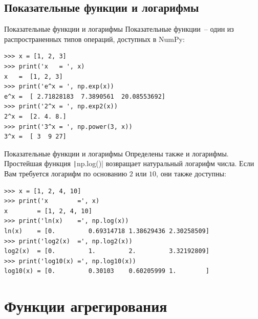 \documentclass[aspectratio=169, mathserif]{beamer}	%
\begin{document}
\subsection{Показательные функции и логарифмы}
\begin{frame}[fragile]{Показательные функции и логарифмы}
\scriptsize
Показательные функции~-- один из  распространенных типов операций, доступных в NumPy:

\begin{verbatim}
>>> x = [1, 2, 3]
>>> print('x   = ', x)
x   =  [1, 2, 3]   
>>> print('e^x = ', np.exp(x))
e^x =  [ 2.71828183  7.3890561  20.08553692]   
>>> print('2^x = ', np.exp2(x))
2^x =  [2. 4. 8.]   
>>> print('3^x = ', np.power(3, x))
3^x =  [ 3  9 27]
\end{verbatim}
\vfill
\end{frame}

\begin{frame}[fragile]{Показательные функции и логарифмы}
\scriptsize
Определены также и логарифмы. Простейшая функция \texttt|np.log()| возвращает натуральный логарифм числа. Если Вам требуется логарифм по основанию $2$ или $10$, они также доступны:

\begin{verbatim}
>>> x = [1, 2, 4, 10]
>>> print('x        =', x)
x        = [1, 2, 4, 10]   
>>> print('ln(x)    =', np.log(x))
ln(x)    = [0.         0.69314718 1.38629436 2.30258509]   
>>> print('log2(x)  =', np.log2(x))
log2(x)  = [0.         1.         2.         3.32192809]   
>>> print('log10(x) =', np.log10(x))
log10(x) = [0.         0.30103    0.60205999 1.        ]
\end{verbatim}
\vfill
\end{frame}


\section{Функции агрегирования}
\sectionframe
\end{document}
